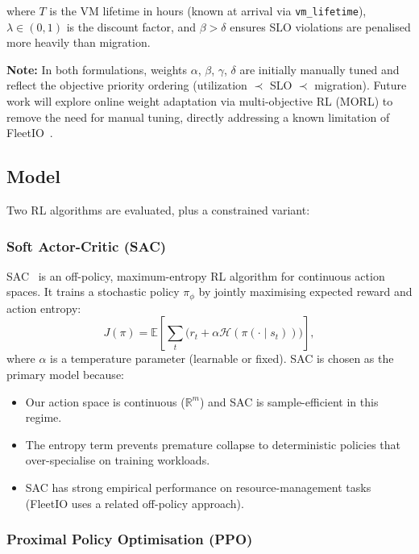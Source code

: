 \documentclass[11pt]{article}
\begin{document}
where $T$ is the VM lifetime in hours (known at arrival via \texttt{vm\_lifetime}),
$\lambda \in (0,1)$ is the discount factor, and $\beta > \delta$ ensures SLO
violations are penalised more heavily than migration.

\noindent\textbf{Note:} In both formulations, weights $\alpha$, $\beta$,
$\gamma$, $\delta$ are initially manually tuned and reflect the objective
priority ordering (utilization $\prec$ SLO $\prec$ migration). Future work
will explore online weight adaptation via multi-objective RL (MORL) to remove
the need for manual tuning, directly addressing a known limitation of
FleetIO~\cite{fleetio2025}.

\subsection{Model}
\label{sec:model}

Two RL algorithms are evaluated, plus a constrained variant:

\subsubsection*{Soft Actor-Critic (SAC)}

SAC~\cite{haarnoja2018sac} is an off-policy, maximum-entropy RL algorithm
for continuous action spaces.  It trains a stochastic policy $\pi_\phi$ by
jointly maximising expected reward and action entropy:
\[
    J(\pi) = \mathbb{E}\!\left[\sum_t \bigl(r_t + \alpha \mathcal{H}(\pi(\cdot \mid s_t))\bigr)\right],
\]
where $\alpha$ is a temperature parameter (learnable or fixed).  SAC is chosen
as the primary model because:
\begin{itemize}
    \item Our action space is continuous ($\mathbb{R}^m$) and SAC is
          sample-efficient in this regime.
    \item The entropy term prevents premature collapse to deterministic
          policies that over-specialise on training workloads.
    \item SAC has strong empirical performance on resource-management tasks
          (FleetIO uses a related off-policy approach).
\end{itemize}

\subsubsection*{Proximal Policy Optimisation (PPO)}
\end{document}
